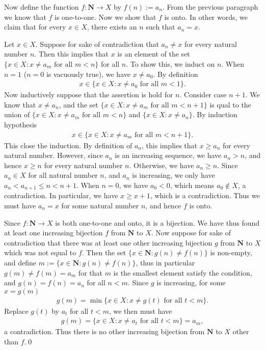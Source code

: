 \documentclass{book}
\begin{document}
Now define the function $f:\mathbf{N}\to X$ by $f(n):=a_n$. From the previous paragraph we know that $f$ is one-to-one. Now we show that $f$ is onto. In other words, we claim that for every $x\in X$, there exists an $n$ such that $a_n=x$.

Let $x\in X$. Suppose for sake of contradiction that $a_n\neq x$ for every natural number $n$. Then this implies that $x$ is an element of the set $\{x\in X:x\neq a_m\text{ for all }m<n\}$ for all $n$. To show this, we induct on $n$. When $n=1$ ($n=0$ is vacuously true), we have $x\neq a_0$. By definition
    \begin{align*}
        x\in\{x\in X:x\neq a_0\text{ for all }m<1\}.
    \end{align*}
Now inductively suppose that the assertion is hold for $n$. Consider case $n+1$. We know that $x\neq a_n$, and the set $\{x\in X:x\neq a_m\text{ for all }m<n+1\}$ is qual to the union of $\{x\in X:x\neq a_m\text{ for all }m<n\}$ and $\{x\in X:x\neq a_n\}$. By induction hypothesis
    \begin{align*}
        x\in\{x\in X:x\neq a_m\text{ for all }m<n+1\}.
    \end{align*}
This close the induction. By definition of $a_n$, this implies that $x\geq a_n$ for every natural number. However, since $a_n$ is an increasing sequence, we have $a_n>n$, and hence $x\geq n$ for every natural number $n$. Otherwise, we have $a_n\geq n$. Since $a_n\in X$ for all natural number $n$, and $a_n$ is increasing, we only have $a_n<a_{n+1}\leq n<n+1$. When $n=0$, we have $a_0<0$, which means $a_0\notin X$, a contradiction. In particular, we have $x\geq x+1$, which is a contradiction. Thus we must have $a_n=x$ for some natural number $n$, and hence $f$ is onto.

Since $f:\mathbf{N}\to X$ is both one-to-one and onto, it is a bijection. We have thus found at least one increasing bijection $f$ from $\mathbf{N}$ to $X$. Now suppose for sake of contradiction that there was at least one other increasing bijection $g$ from $\mathbf{N}$ to $X$ which was not equal to $f$. Then the set $\{x\in\mathbf{N}:g(n)\neq f(n)\}$ is non-empty, and define $m:=\{x\in\mathbf{N}:g(n)\neq f(n)\}$, thus in particular $g(m)\neq f(m)=a_m$ for that $m$ is the smallest element satisfy the condition, and $g(n)=f(n)=a_n$ for all $n<m$. Since $g$ is increasing, for some $x=g(m)$
    \begin{align*}
        g(m)=\min\{x\in X:x\neq g(t)\text{ for all }t<m\}.
    \end{align*}
Replace $g(t)$ by $a_t$ for all $t<m$, we then must have
    \begin{align*}
        g(m)=\{x\in X:x\neq a_t\text{ for all }t<m\}=a_m,
    \end{align*}
a contradiction. Thus there is no other increasing bijection from $\mathbf{N}$ to $X$ other than $f$.\qed
\end{document}
